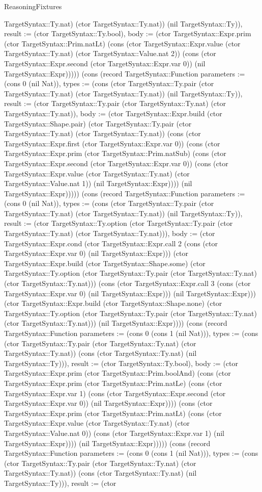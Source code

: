 \begin{lexlean}{ReasoningFixtures}
\begin{semanticmodule}
{TargetSyntax::Ty.nat) (ctor TargetSyntax::Ty.nat)) (nil TargetSyntax::Ty)), result := (ctor TargetSyntax::Ty.bool), body := (ctor TargetSyntax::Expr.prim (ctor TargetSyntax::Prim.natLt) (cons (ctor TargetSyntax::Expr.value (ctor TargetSyntax::Ty.nat) (ctor TargetSyntax::Value.nat 2)) (cons (ctor TargetSyntax::Expr.second (ctor TargetSyntax::Expr.var 0)) (nil TargetSyntax::Expr))))}) (cons (record TargetSyntax::Function {parameters := (cons 0 (nil Nat)), types := (cons (ctor TargetSyntax::Ty.pair (ctor TargetSyntax::Ty.nat) (ctor TargetSyntax::Ty.nat)) (nil TargetSyntax::Ty)), result := (ctor TargetSyntax::Ty.pair (ctor TargetSyntax::Ty.nat) (ctor TargetSyntax::Ty.nat)), body := (ctor TargetSyntax::Expr.build (ctor TargetSyntax::Shape.pair) (ctor TargetSyntax::Ty.pair (ctor TargetSyntax::Ty.nat) (ctor TargetSyntax::Ty.nat)) (cons (ctor TargetSyntax::Expr.first (ctor TargetSyntax::Expr.var 0)) (cons (ctor TargetSyntax::Expr.prim (ctor TargetSyntax::Prim.natSub) (cons (ctor TargetSyntax::Expr.second (ctor TargetSyntax::Expr.var 0)) (cons (ctor TargetSyntax::Expr.value (ctor TargetSyntax::Ty.nat) (ctor TargetSyntax::Value.nat 1)) (nil TargetSyntax::Expr)))) (nil TargetSyntax::Expr))))}) (cons (record TargetSyntax::Function {parameters := (cons 0 (nil Nat)), types := (cons (ctor TargetSyntax::Ty.pair (ctor TargetSyntax::Ty.nat) (ctor TargetSyntax::Ty.nat)) (nil TargetSyntax::Ty)), result := (ctor TargetSyntax::Ty.option (ctor TargetSyntax::Ty.pair (ctor TargetSyntax::Ty.nat) (ctor TargetSyntax::Ty.nat))), body := (ctor TargetSyntax::Expr.cond (ctor TargetSyntax::Expr.call 2 (cons (ctor TargetSyntax::Expr.var 0) (nil TargetSyntax::Expr))) (ctor TargetSyntax::Expr.build (ctor TargetSyntax::Shape.some) (ctor TargetSyntax::Ty.option (ctor TargetSyntax::Ty.pair (ctor TargetSyntax::Ty.nat) (ctor TargetSyntax::Ty.nat))) (cons (ctor TargetSyntax::Expr.call 3 (cons (ctor TargetSyntax::Expr.var 0) (nil TargetSyntax::Expr))) (nil TargetSyntax::Expr))) (ctor TargetSyntax::Expr.build (ctor TargetSyntax::Shape.none) (ctor TargetSyntax::Ty.option (ctor TargetSyntax::Ty.pair (ctor TargetSyntax::Ty.nat) (ctor TargetSyntax::Ty.nat))) (nil TargetSyntax::Expr)))}) (cons (record TargetSyntax::Function {parameters := (cons 0 (cons 1 (nil Nat))), types := (cons (ctor TargetSyntax::Ty.pair (ctor TargetSyntax::Ty.nat) (ctor TargetSyntax::Ty.nat)) (cons (ctor TargetSyntax::Ty.nat) (nil TargetSyntax::Ty))), result := (ctor TargetSyntax::Ty.bool), body := (ctor TargetSyntax::Expr.prim (ctor TargetSyntax::Prim.boolAnd) (cons (ctor TargetSyntax::Expr.prim (ctor TargetSyntax::Prim.natLe) (cons (ctor TargetSyntax::Expr.var 1) (cons (ctor TargetSyntax::Expr.second (ctor TargetSyntax::Expr.var 0)) (nil TargetSyntax::Expr)))) (cons (ctor TargetSyntax::Expr.prim (ctor TargetSyntax::Prim.natLt) (cons (ctor TargetSyntax::Expr.value (ctor TargetSyntax::Ty.nat) (ctor TargetSyntax::Value.nat 0)) (cons (ctor TargetSyntax::Expr.var 1) (nil TargetSyntax::Expr)))) (nil TargetSyntax::Expr))))}) (cons (record TargetSyntax::Function {parameters := (cons 0 (cons 1 (nil Nat))), types := (cons (ctor TargetSyntax::Ty.pair (ctor TargetSyntax::Ty.nat) (ctor TargetSyntax::Ty.nat)) (cons (ctor TargetSyntax::Ty.nat) (nil TargetSyntax::Ty))), result := (ctor }
\end{semanticmodule}
\end{lexlean}
